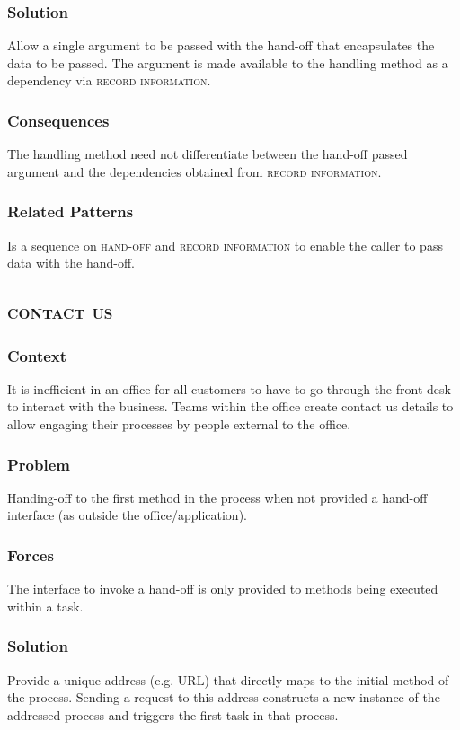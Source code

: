 \documentclass[prodmode]{style/acmlarge}
\begin{document}
\subsubsection*{Solution} Allow a single argument to be passed with the hand-off
that encapsulates the data to be passed.  The argument is made available to the
handling method as a dependency via \textsc{record information}.

\subsubsection*{Consequences} The handling method need not differentiate between
the hand-off passed argument and the dependencies obtained from \textsc{record
information}.

\subsubsection*{Related Patterns} Is a sequence on \textsc{hand-off} and
\textsc{record information} to enable the caller to pass data with the hand-off.



\subsection{\textsc{\textbf{contact us}}}

\subsubsection*{Context} It is inefficient in an office for all customers to
have to go through the front desk to interact with the business.  Teams within
the office create contact us details to allow engaging their processes by people
external to the office.

\subsubsection*{Problem} Handing-off to the first method in the process when not
provided a hand-off interface (as outside the office/application).

\subsubsection*{Forces} The interface to invoke a hand-off is only provided to methods
being executed within a task.

\subsubsection*{Solution} Provide a unique address (e.g. URL) that directly maps
to the initial method of the process.  Sending a request to this address
constructs a new instance of the addressed process and triggers the first task
in that process.
\end{document}
